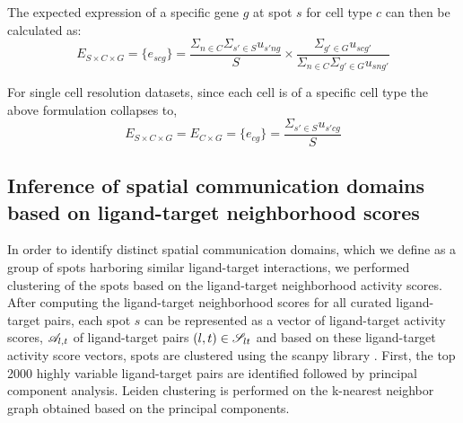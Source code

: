 The expected expression of a specific gene $g$ at spot $s$ for cell type $c$ can then be calculated as:
\begin{equation}
    E_{S \times C \times G} = \{e_{scg}\} = \frac{\Sigma_{n \in C} \Sigma_{s' \in S} u_{s'ng}}{S} \times \frac{\Sigma_{g' \in G} u_{scg'}}{\Sigma_{n \in C} \Sigma_{g' \in G} u_{sng'}}
\end{equation}


For single cell resolution datasets, since each cell is of a specific cell type the above formulation collapses to,\\
\begin{equation}
    E_{S \times C \times G} = E_{C \times G} = \{e_{cg}\} = \frac{\Sigma_{s' \in S} u_{s'cg}}{S}
\end{equation}



\subsection*{Inference of spatial communication domains based on ligand-target neighborhood scores}
In order to identify distinct spatial communication domains, which we define as a group of spots harboring similar ligand-target interactions, we performed clustering of the spots based on the ligand-target neighborhood activity scores. After computing the ligand-target neighborhood scores for all curated ligand-target pairs, each spot $s$ can be represented as a vector of ligand-target activity scores, $\mathcal{A}_{l,t}$ of ligand-target pairs $(l,t) \in \mathcal{S}_{lt}$ and based on these ligand-target activity score vectors, spots are clustered using the scanpy library \citep{Wolf2018}. First, the top 2000 highly variable ligand-target pairs are identified followed by principal component analysis. Leiden clustering is performed on the k-nearest neighbor graph obtained based on the principal components. 

